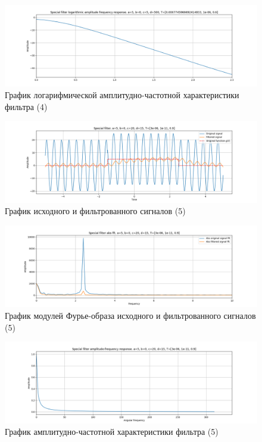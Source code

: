 \documentclass[a4paper, 12pt]{article}
\begin{document}
    \begin{figure}[H]
        \centering
        \includegraphics[scale=0.4]{4_fl2_lafr.png}
        \captionsetup{skip=0pt}
        \caption{График логарифмической амплитудно-частотной характеристики фильтра (4)}
        \label{fig:filinlafr24}
    \end{figure}
    \begin{figure}[H]
        \centering
        \includegraphics[scale=0.4]{5_fl2.png}
        \captionsetup{skip=0pt}
        \caption{График исходного и фильтрованного сигналов (5)}
        \label{fig:filin25}
    \end{figure}
    \begin{figure}[H]
        \centering
        \includegraphics[scale=0.4]{5_fl2_abs.png}
        \captionsetup{skip=0pt}
        \caption{График модулей Фурье-образа исходного и фильтрованного сигналов (5)}
        \label{fig:filinabs25}
    \end{figure}
    \begin{figure}[H]
        \centering
        \includegraphics[scale=0.4]{5_fl2_afr.png}
        \captionsetup{skip=0pt}
        \caption{График амплитудно-частотной характеристики фильтра (5)}
        \label{fig:filinafr25}
    \end{figure}
\end{document}
